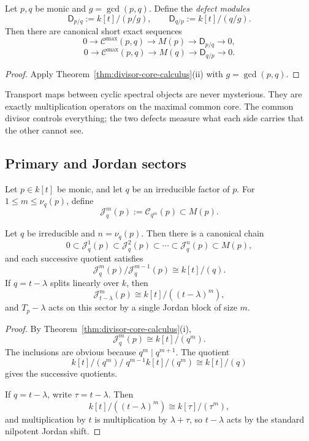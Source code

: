 \begin{corollary}
\ClaimStatusProvedHere
\label{cor:spectral-defects}
Let \(p,q\) be monic and \(g=\gcd(p,q)\).
Define the \emph{defect modules}
\[
\mathsf D_{p/q}:=k[t]/(p/g),
\qquad
\mathsf D_{q/p}:=k[t]/(q/g).
\]
Then there are canonical short exact sequences
\[
0\longrightarrow \mathcal C^{\max}(p,q)\longrightarrow M(p)\longrightarrow \mathsf D_{p/q}\longrightarrow 0,
\]
\[
0\longrightarrow \mathcal C^{\max}(p,q)\longrightarrow M(q)\longrightarrow \mathsf D_{q/p}\longrightarrow 0.
\]
\end{corollary}

\begin{proof}
Apply Theorem~\ref{thm:divisor-core-calculus}\textup{(ii)} with \(g=\gcd(p,q)\).
\end{proof}

\begin{remark}
Transport maps between cyclic spectral objects are never mysterious.
They are exactly multiplication operators on the maximal common core.
The common divisor controls everything; the two defects measure what each side carries that the other cannot see.
\end{remark}

\subsection{Primary and Jordan sectors}

\begin{definition}
Let \(p\in k[t]\) be monic, and let \(q\) be an irreducible factor of \(p\).
For \(1\le m\le \nu_q(p)\), define
\[
\mathcal J_q^m(p):=\mathcal C_{q^m}(p)\subset M(p).
\]
\end{definition}

\begin{theorem}
\ClaimStatusProvedHere
\label{thm:primary-jordan-filtration}
Let \(q\) be irreducible and \(n=\nu_q(p)\).
Then there is a canonical chain
\[
0\subset \mathcal J_q^1(p)\subset \mathcal J_q^2(p)\subset \cdots \subset \mathcal J_q^n(p)\subset M(p),
\]
and each successive quotient satisfies
\[
\mathcal J_q^m(p)/\mathcal J_q^{m-1}(p)\cong k[t]/(q).
\]
If \(q=t-\lambda\) splits linearly over \(k\), then
\[
\mathcal J_{t-\lambda}^m(p)\cong k[t]/((t-\lambda)^m),
\]
and \(T_p-\lambda\) acts on this sector by a single Jordan block of size \(m\).
\end{theorem}

\begin{proof}
By Theorem~\ref{thm:divisor-core-calculus}\textup{(i)},
\[
\mathcal J_q^m(p)\cong k[t]/(q^m).
\]
The inclusions are obvious because \(q^m\mid q^{m+1}\).
The quotient
\[
k[t]/(q^m)\Big/\; q^{m-1}k[t]/(q^m)\cong k[t]/(q)
\]
gives the successive quotients.

If \(q=t-\lambda\), write \(\tau=t-\lambda\).
Then
\[
k[t]/((t-\lambda)^m)\cong k[\tau]/(\tau^m),
\]
and multiplication by \(t\) is multiplication by \(\lambda+\tau\), so \(t-\lambda\) acts by the standard nilpotent Jordan shift.
\end{proof}

